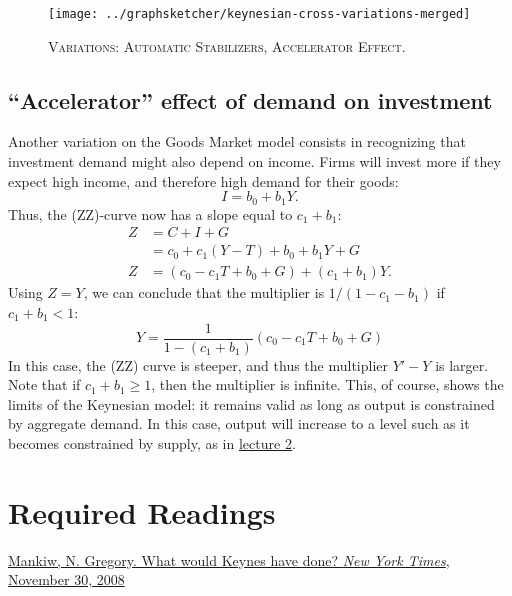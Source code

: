 \documentclass[]{book}
\theoremstyle{definition}
\theoremstyle{definition}
\theoremstyle{definition}
\theoremstyle{remark}
\begin{document}
\begin{figure}

{\centering \texttt{[image: ../graphsketcher/keynesian-cross-variations-merged]} 

}

\caption{\textsc{Variations: Automatic Stabilizers,
Accelerator Effect}.}\label{fig:keynes-variations}
\end{figure}

\hypertarget{accelerator}{\subsection{\texorpdfstring{``Accelerator''
effect of demand on
investment}{Accelerator effect of demand on investment}}\label{accelerator}}

Another variation on the Goods Market model consists in recognizing that
investment demand might also depend on income. Firms will invest more if
they expect high income, and therefore high demand for their goods:
\[I=b_{0}+b_{1}Y.\] Thus, the (ZZ)-curve now has a slope equal to
\(c_1+b_1\): \[
\begin{aligned}
Z   &=C+I+G\\
    &=c_{0}+c_{1}\left(Y-T\right)+b_{0}+b_{1}Y+G\\
Z   &=\left(c_{0}-c_{1}T+b_{0}+G\right)+\left(c_{1}+b_{1}\right)Y.
\end{aligned}
\] Using \(Z=Y\), we can conclude that the multiplier is
\(1/(1-c_1-b_1)\) if \(c_{1}+b_{1}<1\):
\[Y=\frac{1}{1-\left(c_{1}+b_{1}\right)}\left(c_{0}-c_{1}T+b_{0}+G\right)\]
In this case, the (ZZ) curve is steeper, and thus the multiplier
\(Y'-Y\) is larger. Note that if \(c_{1}+b_{1}\geq1\), then the
multiplier is infinite. This, of course, shows the limits of the
Keynesian model: it remains valid as long as output is constrained by
aggregate demand. In this case, output will increase to a level such as
it becomes constrained by supply, as in
\protect\hyperlink{solow}{lecture 2}.

\section*{Required Readings}\label{required-readings}

\href{https://search.proquest.com/docview/433963341/fulltext/43832006CCFE4D96PQ/1?accountid=14512}{Mankiw,
N. Gregory. What would Keynes have done? \emph{New York Times}, November
30, 2008}
\end{document}
